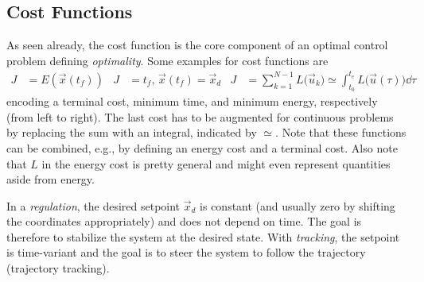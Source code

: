 		\subsection{Cost Functions}
			As seen already, the cost function is the core component of an optimal control problem defining \emph{optimality}. Some examples for cost functions are
			\begin{align}
				J & = E(\vec{x}(t_f))                                                                                                &
				J & = t_f,\, \vec{x}(t_f) = \vec{x}_d                                                                                &
				J & = \sum_{k = 1}^{N - 1} L\bigl( \vec{u}_k \bigr) \simeq \int_{t_0}^{t_e}\! L\bigl( \vec{u}(\tau) \bigr) \dd{\tau}
			\end{align}
			encoding a terminal cost, minimum time, and minimum energy, respectively (from left to right). The last cost has to be augmented for continuous problems by replacing the sum with an integral, indicated by \( \simeq \). Note that these functions can be combined, e.g., by defining an energy cost and a terminal cost. Also note that \(L\) in the energy cost is pretty general and might even represent quantities aside from energy.

			In a \emph{regulation}, the desired setpoint \(\vec{x}_d\) is constant (and usually zero by shifting the coordinates appropriately) and does not depend on time. The goal is therefore to stabilize the system at the desired state. With \emph{tracking}, the setpoint is time-variant and the goal is to steer the system to follow the trajectory (trajectory tracking).

